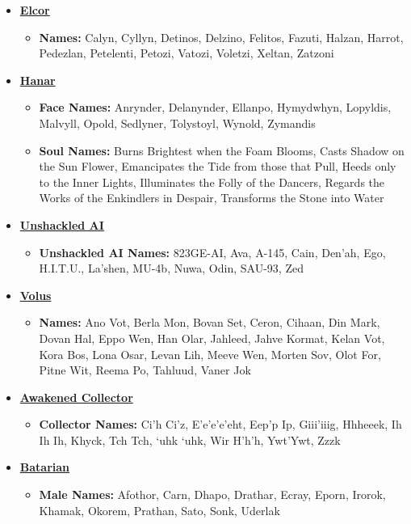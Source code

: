 \begin{scifitablebox}[screenbox,title=\textcolor{PanelGlow}{Names}]
\begin{itemize}
  \item \textbf{\underline{Elcor}}
  \begin{itemize}
    \item \textbf{Names:} Calyn, Cyllyn, Detinos, Delzino, Felitos, Fazuti, Halzan, Harrot, Pedezlan, Petelenti, Petozi, Vatozi, Voletzi, Xeltan, Zatzoni
  \end{itemize}
  \item \textbf{\underline{Hanar}}
  \begin{itemize}
    \item \textbf{Face Names:} Anrynder, Delanynder, Ellanpo, Hymydwhyn, Lopyldis, Malvyll, Opold, Sedlyner, Tolystoyl, Wynold, Zymandis
    \item \textbf{Soul Names:} Burns Brightest when the Foam Blooms, Casts Shadow on the Sun Flower, Emancipates the Tide from those that Pull, Heeds only to the Inner Lights, Illuminates the Folly of the Dancers, Regards the Works of the Enkindlers in Despair, Transforms the Stone into Water
  \end{itemize}
  \item \textbf{\underline{Unshackled AI}}
  \begin{itemize}
    \item \textbf{Unshackled AI Names:} 823GE-AI, Ava, A-145, Cain, Den’ah, Ego, H.I.T.U., La’shen, MU-4b, Nuwa, Odin, SAU-93, Zed
  \end{itemize}
  \item \textbf{\underline{Volus}}
  \begin{itemize}
    \item \textbf{Names:} Ano Vot, Berla Mon, Bovan Set, Ceron, Cihaan, Din Mark, Dovan Hal, Eppo Wen, Han Olar, Jahleed, Jahve Kormat, Kelan Vot, Kora Bos, Lona Osar, Levan Lih, Meeve Wen, Morten Sov, Olot For, Pitne Wit, Reema Po, Tahluud, Vaner Jok
  \end{itemize}
  \item \textbf{\underline{Awakened Collector}}
  \begin{itemize}
    \item \textbf{Collector Names:} Ci’h Ci’z, E’e’e’e’eht, Eep’p Ip, Giii’iiig, Hhheeek, Ih Ih Ih, Khyck, Tch Tch, ‘uhk ‘uhk, Wir H’h’h, Ywt’Ywt, Zzzk
  \end{itemize}
  \item \textbf{\underline{Batarian}}
  \begin{itemize}
    \item \textbf{Male Names:} Afothor, Carn, Dhapo, Drathar, Ecray, Eporn, Irorok, Khamak, Okorem, Prathan, Sato, Sonk, Uderlak

\end{itemize}
\end{itemize}
\end{scifitablebox}
